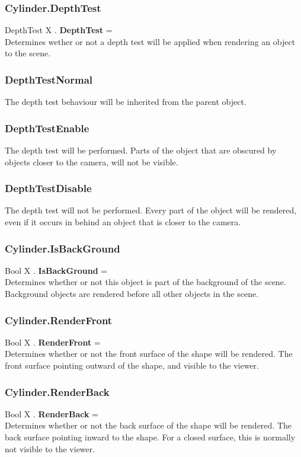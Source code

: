\subsubsection{Cylinder.DepthTest \label{F:Cylinder:DepthTest}}
DepthTest X . \textbf{DepthTest} = \\
Determines wether or not a depth test will be applied when rendering an object to the scene.

\subsubsection{DepthTestNormal \label{T:DepthTest|DepthTestNormal}}
The depth test behaviour will be inherited from the parent object.

\subsubsection{DepthTestEnable \label{T:DepthTest|DepthTestEnable}}
The depth test will be performed. Parts of the object that are obscured by objects closer to the camera, will not be visible.

\subsubsection{DepthTestDisable \label{T:DepthTest|DepthTestDisable}}
The depth test will not be performed. Every part of the object will be rendered, even if it occurs in behind an object that is closer to the camera.

\subsubsection{Cylinder.IsBackGround \label{F:Cylinder:IsBackGround}}
Bool X . \textbf{IsBackGround} = \\
Determines whether or not this object is part of the background of the scene. Background objects are rendered before all other objects in the scene.

\subsubsection{Cylinder.RenderFront \label{F:Cylinder:RenderFront}}
Bool X . \textbf{RenderFront} = \\
Determines whether or not the front surface of the shape will be rendered. The front surface pointing outward of the shape, and visible to the viewer.

\subsubsection{Cylinder.RenderBack \label{F:Cylinder:RenderBack}}
Bool X . \textbf{RenderBack} = \\
Determines whether or not the back surface of the shape will be rendered. The back surface pointing inward to the shape. For a closed surface, this is normally not visible to the viewer.

